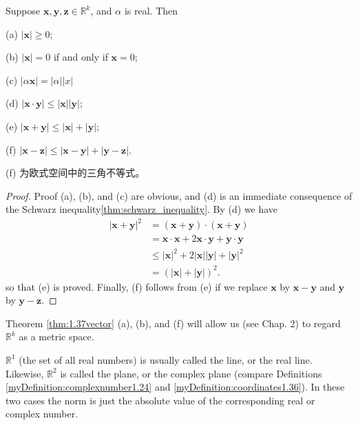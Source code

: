 \begin{thm}\label{thm:1.37vector}
    Suppose $\mathbf{x}, \mathbf{y}, \mathbf{z}\in\mathbb{R}^k$, and $\alpha$ is real. Then

(a) $| \mathbf{x}| \geq 0$;

(b) $| \mathbf{x}| = 0$ if and only if $\mathbf{x} =0$;

(c) $| \alpha \mathbf{x}| = | \alpha||x|$

(d) $|\mathbf{x}\cdot\mathbf{y}| \leq  |\mathbf{x}| | \mathbf{y}|$;

(e) $|\mathbf{x}+\mathbf{y}| \leq | \mathbf{x} | + | \mathbf{y}|$;

(f) $|\mathbf{x}-\mathbf{z}| \leq |\mathbf{x}-\mathbf{y}| + |\mathbf{y}-\mathbf{z}|$.
\end{thm}

(f) 为欧式空间中的三角不等式。

\begin{proof}
    Proof (a), (b), and (c) are obvious, and (d) is an immediate consequence of the Schwarz inequality\ref{thm:schwarz_inequality}. By (d) we have 
    \begin{align*}
        |\mathbf{x} + \mathbf{y}|^2
        &= (\mathbf{x} + \mathbf{y}) \cdot (\mathbf{x} + \mathbf{y})\\
        &= \mathbf{x} \cdot \mathbf{x} + 2\mathbf{x} \cdot \mathbf{y} + \mathbf{y} \cdot \mathbf{y}\\
        &\leq |\mathbf{x}|^2 + 2|\mathbf{x}||\mathbf{y}| + |\mathbf{y}|^2\\
        &= \left(|\mathbf{x}| + |\mathbf{y}|\right)^2.
    \end{align*}
    so that (e) is proved. Finally, (f) follows from (e) if we replace $\mathbf{x}$ by $\mathbf{x}-\mathbf{y}$ and $\mathbf{y}$ by $\mathbf{y}-\mathbf{z}$.
\end{proof}

\begin{myRemark}\label{myRemark:1.38}
    Theorem \ref{thm:1.37vector} (a), (b), and (f) will allow us (see Chap. 2) to
    regard $\mathbb{R}^k$ as a metric space.
    
    $\mathbb{R}^1$ (the set of all real numbers) is usually called the line, or the real line. Likewise, $\mathbb{R}^2$ is called the plane, or the complex plane (compare Definitions \ref{myDefinition:complexnumber1.24} and \ref{myDefinition:coordinates1.36}). In these two cases the norm is just the absolute value of the corresponding real or complex number. 
\end{myRemark}
